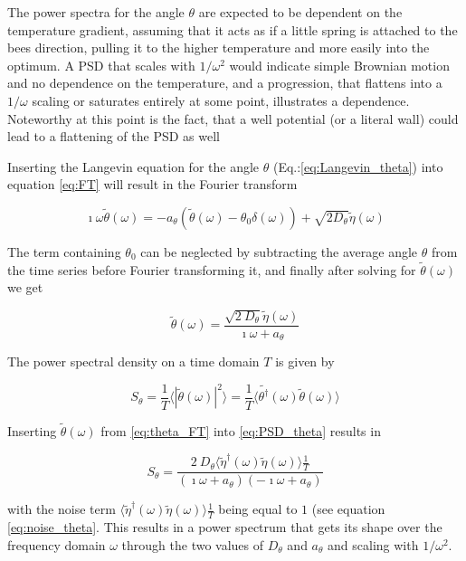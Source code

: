 The power spectra for the angle $\theta$ are expected to be dependent on the temperature gradient, assuming that it acts as if a little spring is attached to the bees direction, pulling it to the higher temperature and more easily into the optimum. A PSD that scales with $1/\omega^{2}$ would indicate simple Brownian motion and no dependence on the temperature, and a progression, that flattens into a $1/\omega$ scaling or saturates entirely at some point, illustrates a dependence. Noteworthy at this point is the fact, that a well potential (or a literal wall) could lead to a flattening of the PSD as well

Inserting the Langevin equation for the angle $\theta$ (Eq.:\ref{eq:Langevin_theta}) into equation \ref{eq:FT} will result in the Fourier transform 

\begin{equation}
\label{eq:Langevin_FT}
    \imath\omega\tilde{\theta}(\omega)=-a_{\theta}\left(\tilde{\theta}(\omega)-\theta_{0}\delta(\omega)\right)+\sqrt{2D_{\theta}}\tilde{\eta}(\omega)
\end{equation}

The term containing $\theta_{0}$ can be neglected by subtracting the average angle $\theta$ from the time series before Fourier transforming it, and finally after solving for $\tilde{\theta}(\omega)$ we get

\begin{equation}
\label{eq:theta_FT}
    \tilde{\theta}(\omega) = \frac{\sqrt{2\ D_{\theta}}\tilde{\eta}(\omega)}{\imath\omega+a_{\theta}}
\end{equation}

The power spectral density on a time domain $T$ is given by

\begin{equation}
\label{eq:PSD_theta}
    S_{\theta} = \frac{1}{T}\langle|\tilde{\theta}(\omega)|^{2}\rangle =\frac{1}{T}\langle\tilde{\theta^{\dagger}}(\omega)\tilde{\theta}(\omega)\rangle
\end{equation}

Inserting $\tilde{\theta}(\omega)$ from \ref{eq:theta_FT} into \ref{eq:PSD_theta} results in

\begin{equation}
    S_{\theta} = \frac{2\ D_{\theta}\langle\tilde{\eta}^{\dagger}(\omega)\tilde{\eta}(\omega)\rangle\frac{1}{T}}{(\imath\omega+a_{\theta})(-\imath\omega+a_{\theta})}
\end{equation}

with the noise term $\langle\tilde{\eta}^{\dagger}(\omega)\tilde{\eta}(\omega)\rangle\frac{1}{T}$ being equal to $1$ (see equation \ref{eq:noise_theta}. This results in a power spectrum that gets its shape over the frequency domain $\omega$ through the two values of $D_{\theta}$ and $a_{\theta}$ and scaling with $1/\omega^{2}$.

